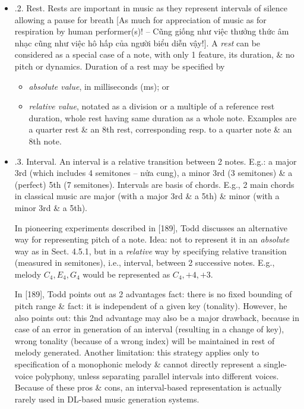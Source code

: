 \documentclass{article}
\begin{document}
\begin{itemize}
\begin{itemize}
\begin{itemize}
\begin{itemize}
\begin{enumerate}
				\end{enumerate}
			\end{itemize}
			\item {.2. Rest.} Rests are important in music as they represent intervals of silence allowing a pause for breath [As much for appreciation of music as for respiration by human performer(s)! -- Cũng giống như việc thưởng thức âm nhạc cũng như việc hô hấp của người biểu diễn vậy!]. A {\it rest} can be considered as a special case of a note, with only 1 feature, its duration, \& no pitch or dynamics. Duration of a rest may be specified by
			\begin{itemize}
				\item {\it absolute value}, in milliseconds (ms); or
				\item {\it relative value}, notated as a division or a multiple of a reference rest duration, whole rest having same duration as a whole note. Examples are a quarter rest \& an 8th rest, corresponding resp. to a quarter note \& an 8th note.
			\end{itemize}
			\item {.3. Interval.} An interval is a relative transition between 2 notes. E.g.: a major 3rd (which includes 4 semitones -- nửa cung), a minor 3rd (3 semitones) \& a (perfect) 5th (7 semitones). Intervals are basis of chords. E.g., 2 main chords in classical music are major (with a major 3rd \& a 5th) \& minor (with a minor 3rd \& a 5th).
			
			In pioneering experiments described in [189], {\sc Todd} discusses an alternative way for representing pitch of a note. Idea: not to represent it in an {\it absolute} way as in Sect. 4.5.1, but in a {\it relative} way by specifying relative transition (measured in semitones), i.e., interval, between 2 successive notes. E.g., melody $C_4,E_4,G_4$ would be represented as $C_4,+4,+3$.
			
			In [189], {\sc Todd} points out as 2 advantages fact: there is no fixed bounding of pitch range \& fact: it is independent of a given key (tonality). However, he also points out: this 2nd advantage may also be a major drawback, because in case of an error in generation of an interval (resulting in a change of key), wrong tonality (because of a wrong index) will be maintained in rest of melody generated. Another limitation: this strategy applies only to specification of a monophonic melody \& cannot directly represent a single-voice polyphony, unless separating parallel intervals into different voices. Because of these pros \& cons, an interval-based representation is actually rarely used in DL-based music generation systems.
			

\end{itemize}
\end{itemize}
\end{itemize}
\end{document}
